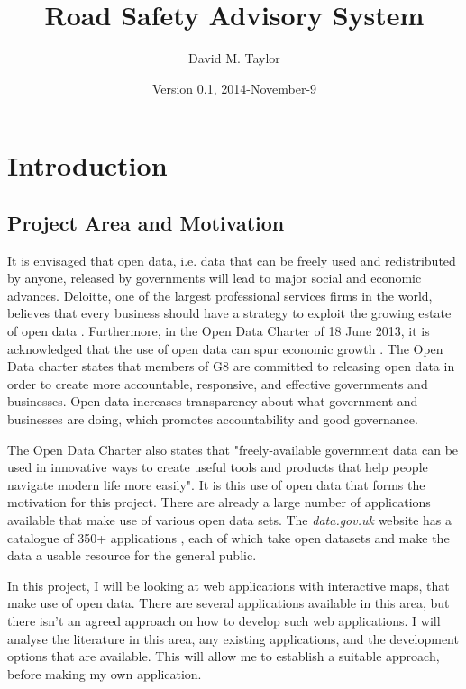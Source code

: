 \documentclass[authoryearcitations]{UoYCSproject}
\author{David M. Taylor}
\title{Road Safety Advisory System}
\date{Version 0.1, 2014-November-9}
\begin{document}
\maketitle
\listoffigures
\listoftables
\renewcommand*{\lstlistlistingname}{List of Listings}
\lstlistoflistings

\cleardoublepage
\label{sec:start}
\thispagestyle{empty}\cleardoublepage

\chapter{Introduction}

\section{Project Area and Motivation}

It is envisaged that open data, i.e. data that can be freely used and redistributed by anyone, released by governments will lead to major social and economic advances. Deloitte, one of the largest professional services firms in the world, believes that every business should have a strategy to exploit the growing estate of open data \citep{DeloitteAnalytics2012}. Furthermore, in the Open Data Charter of 18 June 2013, it is acknowledged that the use of open data can spur economic growth \citep{CabinetOffice2013}. The Open Data charter states that members of G8 are committed to releasing open data in order to create more accountable, responsive, and effective governments and businesses. Open data increases transparency about what government and businesses are doing, which promotes accountability and good governance.

The Open Data Charter also states that "freely-available government data can be used in innovative ways to create useful tools and products that help people navigate modern life more easily". It is this use of open data that forms the motivation for this project. There are already a large number of applications available that make use of various open data sets. The \textit{data.gov.uk} website has a catalogue of 350+ applications \citep{Data.go}, each of which take open datasets and make the data a usable resource for the general public. 

In this project, I will be looking at web applications with interactive maps, that make use of open data. There are several applications available in this area, but there isn't an agreed approach on how to develop such web applications. I will analyse the literature in this area, any existing applications, and the development options that are available. This will allow me to establish a suitable approach, before making my own application.
\end{document}
